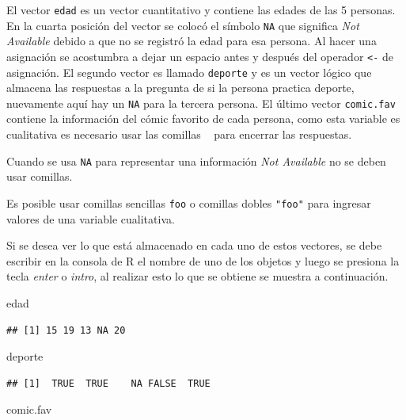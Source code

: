 \documentclass[10pt,]{krantz}
\makeatletter
\newenvironment{Shaded}{\begin{snugshade}}{\end{snugshade}}
\newcommand{\NormalTok}[1]{#1}
\newenvironment{kframe}{%
\medskip{}
\setlength{\fboxsep}{.8em}
 \def\at@end@of@kframe{}%
 \ifinner\ifhmode%
  \def\at@end@of@kframe{\end{minipage}}%
  \begin{minipage}{\columnwidth}%
 \fi\fi%
 \def\FrameCommand##1{\hskip\@totalleftmargin \hskip-\fboxsep
 \colorbox{shadecolor}{##1}\hskip-\fboxsep
     \hskip-\linewidth \hskip-\@totalleftmargin \hskip\columnwidth}%
 \MakeFramed {\advance\hsize-\width
   \@totalleftmargin\z@ \linewidth\hsize
   \@setminipage}}%
 {\par\unskip\endMakeFramed%
 \at@end@of@kframe}
\renewenvironment{Shaded}{\begin{kframe}}{\end{kframe}}
\let\BeginKnitrBlock\begin \let\EndKnitrBlock\end
\makeatother
\begin{document}
El vector \texttt{edad} es un vector cuantitativo y contiene las edades
de las 5 personas. En la cuarta posición del vector se colocó el símbolo
\texttt{NA} que significa \textit{Not Available} debido a que no se
registró la edad para esa persona. Al hacer una asignación se acostumbra
a dejar un espacio antes y después del operador \texttt{\textless{}-} de
asignación. El segundo vector es llamado \texttt{deporte} y es un vector
lógico que almacena las respuestas a la pregunta de si la persona
practica deporte, nuevamente aquí hay un \texttt{NA} para la tercera
persona. El último vector \texttt{comic.fav} contiene la información del
cómic favorito de cada persona, como esta variable es cualitativa es
necesario usar las comillas
\texttt{\textquotesingle{}\ \textquotesingle{}} para encerrar las
respuestas.

\BeginKnitrBlock{rmdwarning}
Cuando se usa \texttt{NA} para representar una información
\textit{Not Available} no se deben usar comillas.
\EndKnitrBlock{rmdwarning}

\BeginKnitrBlock{rmdnote}
Es posible usar comillas sencillas
\texttt{\textquotesingle{}foo\textquotesingle{}} o comillas dobles
\texttt{"foo"} para ingresar valores de una variable cualitativa.
\EndKnitrBlock{rmdnote}

Si se desea ver lo que está almacenado en cada uno de estos vectores, se
debe escribir en la consola de R el nombre de uno de los objetos y luego
se presiona la tecla \textit{enter} o \textit{intro}, al realizar esto
lo que se obtiene se muestra a continuación.

\begin{Shaded}
\begin{Highlighting}[]
\NormalTok{edad}
\end{Highlighting}
\end{Shaded}

\begin{verbatim}
## [1] 15 19 13 NA 20
\end{verbatim}

\begin{Shaded}
\begin{Highlighting}[]
\NormalTok{deporte}
\end{Highlighting}
\end{Shaded}

\begin{verbatim}
## [1]  TRUE  TRUE    NA FALSE  TRUE
\end{verbatim}

\begin{Shaded}
\begin{Highlighting}[]
\NormalTok{comic.fav}
\end{Highlighting}
\end{Shaded}
\end{document}
